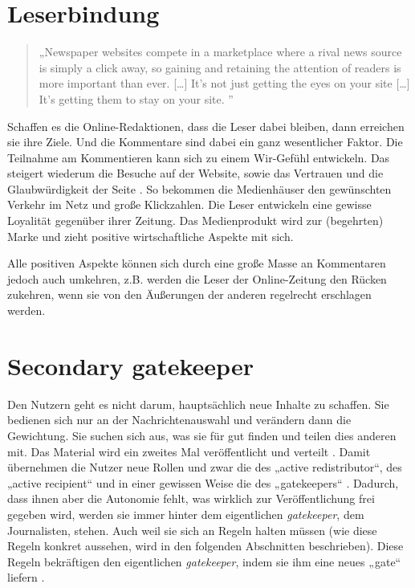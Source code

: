 \section{Leserbindung}

\begin{quote}
„Newspaper websites compete in a marketplace where a rival news source is simply
a click away, so gaining and retaining the attention of readers is more
important than ever. [\ldots] It’s not just getting the eyes on your site
[\ldots] It’s getting them to stay on your site. ” \autocite[S.~144]{singer}
\end{quote}

Schaffen es die Online-Redaktionen, dass die Leser dabei bleiben, dann erreichen
sie ihre Ziele. Und die Kommentare sind dabei ein ganz wesentlicher Faktor. Die
Teilnahme am Kommentieren kann sich zu einem Wir-Gefühl entwickeln. Das steigert
wiederum die Besuche auf der Website, sowie das Vertrauen und die
Glaubwürdigkeit der Seite \autocite[S.~215]{meyer-carey}. So bekommen die
Medienhäuser den gewünschten Verkehr im Netz und große Klickzahlen. Die Leser
entwickeln eine gewisse Loyalität gegenüber ihrer Zeitung. Das Medienprodukt
wird zur (begehrten) Marke und zieht positive wirtschaftliche Aspekte mit sich.

Alle positiven Aspekte können sich durch eine große Masse an Kommentaren jedoch
auch umkehren, z.B. werden die Leser der Online-Zeitung den Rücken zukehren,
wenn sie von den Äußerungen der anderen regelrecht erschlagen werden.


\section{Secondary gatekeeper} \label{sec:secondary-gate}

Den Nutzern geht es nicht darum, hauptsächlich neue Inhalte zu schaffen. Sie
bedienen sich nur an der Nachrichtenauswahl und verändern dann die Gewichtung.
Sie suchen sich aus, was sie für gut finden und teilen dies anderen mit. Das
Material wird ein zweites Mal veröffentlicht und verteilt
\autocite[S.~66]{singer:2014}. Damit übernehmen die Nutzer neue Rollen und zwar
die des „active redistributor“, des „active recipient“ und in einer gewissen
Weise die des „gatekeepers“ \autocite[S.~57]{singer:2014}. Dadurch, dass ihnen
aber die Autonomie fehlt, was wirklich zur Veröffentlichung frei gegeben wird,
werden sie immer hinter dem eigentlichen \emph{gatekeeper}, dem Journalisten,
stehen. Auch weil sie sich an Regeln halten müssen (wie diese Regeln konkret
aussehen, wird in den folgenden Abschnitten beschrieben). Diese Regeln
bekräftigen den eigentlichen \emph{gatekeeper}, indem sie ihm eine neues „gate“
liefern \autocite[S.~13]{santana:2014}.


